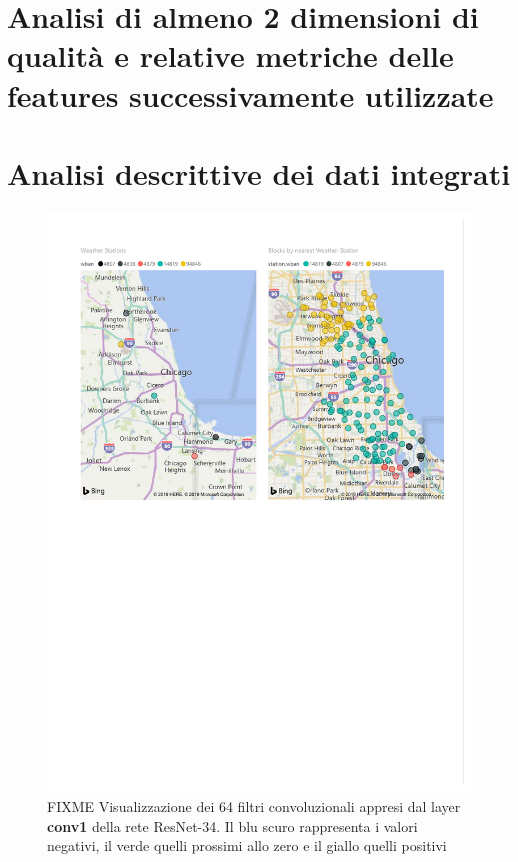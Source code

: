 


\chapter{Analisi di almeno 2 dimensioni di qualità e relative metriche delle features successivamente utilizzate}

\chapter{Analisi descrittive dei dati integrati}

\begin{figure}[htb]
	\centering
	\includegraphics[width=0.8\columnwidth]{images/WeatherStations}
	\caption{FIXME Visualizzazione dei 64 filtri convoluzionali appresi dal 
	layer \textbf{conv1} della rete ResNet-34. Il blu scuro rappresenta i 
	valori negativi, il verde quelli prossimi allo zero e il giallo quelli 
	positivi}
	\label{fig:weather-stations}
\end{figure}

